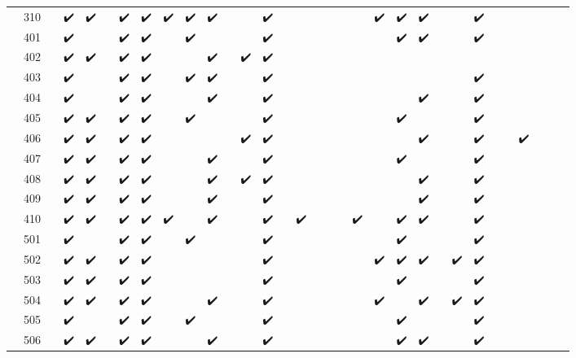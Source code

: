 \begin{tabular}{llcccccccccccccccccccccccccccccc}
 & 310 &  & ✔️ & ✔️ &  & ✔️ & ✔️ & ✔️ & ✔️ & ✔️ &  &  & ✔️ &  &  &  &  &  &  & ✔️ & ✔️ & ✔️ &  &  & ✔️ &  &  &  &  &  &  \\
 & 401 &  & ✔️ &  &  & ✔️ & ✔️ &  & ✔️ &  &  &  & ✔️ &  &  &  &  &  &  &  & ✔️ & ✔️ &  &  & ✔️ &  &  &  &  &  &  \\
 & 402 &  & ✔️ & ✔️ &  & ✔️ & ✔️ &  &  & ✔️ &  & ✔️ & ✔️ &  &  &  &  &  &  &  &  &  &  &  &  &  &  &  &  &  &  \\
 & 403 &  & ✔️ &  &  & ✔️ & ✔️ &  & ✔️ & ✔️ &  &  & ✔️ &  &  &  &  &  &  &  &  &  &  &  & ✔️ &  &  &  &  &  &  \\
 & 404 &  & ✔️ &  &  & ✔️ & ✔️ &  &  & ✔️ &  &  & ✔️ &  &  &  &  &  &  &  &  & ✔️ &  &  & ✔️ &  &  &  &  &  &  \\
 & 405 &  & ✔️ & ✔️ &  & ✔️ & ✔️ &  & ✔️ &  &  &  & ✔️ &  &  &  &  &  &  &  & ✔️ &  &  &  & ✔️ &  &  &  &  &  &  \\
 & 406 &  & ✔️ & ✔️ &  & ✔️ & ✔️ &  &  &  &  & ✔️ & ✔️ &  &  &  &  &  &  &  &  & ✔️ &  &  & ✔️ &  &  & ✔️ &  &  &  \\
 & 407 &  & ✔️ & ✔️ &  & ✔️ & ✔️ &  &  & ✔️ &  &  & ✔️ &  &  &  &  &  &  &  & ✔️ &  &  &  & ✔️ &  &  &  &  &  &  \\
 & 408 &  & ✔️ & ✔️ &  & ✔️ & ✔️ &  &  & ✔️ &  & ✔️ & ✔️ &  &  &  &  &  &  &  &  & ✔️ &  &  & ✔️ &  &  &  &  &  &  \\
 & 409 &  & ✔️ & ✔️ &  & ✔️ & ✔️ &  &  & ✔️ &  &  & ✔️ &  &  &  &  &  &  &  &  & ✔️ &  &  & ✔️ &  &  &  &  &  &  \\
 & 410 &  & ✔️ & ✔️ &  & ✔️ & ✔️ & ✔️ &  & ✔️ &  &  & ✔️ &  & ✔️ &  &  &  & ✔️ &  & ✔️ & ✔️ &  &  & ✔️ &  &  &  &  &  &  \\
 & 501 &  & ✔️ &  &  & ✔️ & ✔️ &  & ✔️ &  &  &  & ✔️ &  &  &  &  &  &  &  & ✔️ &  &  &  & ✔️ &  &  &  &  &  &  \\
 & 502 &  & ✔️ & ✔️ &  & ✔️ & ✔️ &  &  &  &  &  & ✔️ &  &  &  &  &  &  & ✔️ & ✔️ & ✔️ &  & ✔️ & ✔️ &  &  &  &  &  &  \\
 & 503 &  & ✔️ & ✔️ &  & ✔️ & ✔️ &  &  &  &  &  & ✔️ &  &  &  &  &  &  &  & ✔️ &  &  &  & ✔️ &  &  &  &  &  &  \\
 & 504 &  & ✔️ & ✔️ &  & ✔️ & ✔️ &  &  & ✔️ &  &  & ✔️ &  &  &  &  &  &  & ✔️ &  & ✔️ &  & ✔️ & ✔️ &  &  &  &  &  &  \\
 & 505 &  & ✔️ &  &  & ✔️ & ✔️ &  & ✔️ &  &  &  & ✔️ &  &  &  &  &  &  &  & ✔️ &  &  &  & ✔️ &  &  &  &  &  &  \\
 & 506 &  & ✔️ & ✔️ &  & ✔️ & ✔️ &  &  & ✔️ &  &  & ✔️ &  &  &  &  &  &  &  & ✔️ & ✔️ &  &  & ✔️ &  &  &  &  &  &  \\

\end{tabular}
